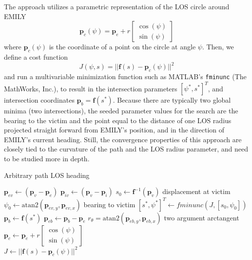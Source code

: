 \documentclass[conference]{IEEEtran}
\newcommand{\reference}{r_\theta}
\begin{document}
The approach utilizes a parametric representation of the LOS circle around EMILY
\begin{equation}
  \bm{p}_c(\psi) = \bm{p}_{e} + r \begin{bmatrix}
    \cos(\psi) \\ \sin(\psi)
  \end{bmatrix}
\end{equation}
where $\bm{p}_c(\psi)$ is the coordinate of a point on the circle at angle $\psi$. Then, we define a cost function
\begin{equation}
  J(\psi, s) = || \bm{f}(s) - \bm{p}_c(\psi) ||^2
\end{equation}
and run a multivariable minimization function such as MATLAB's \texttt{fminunc} (The MathWorks, Inc.), to result in the intersection parameters $[\psi^*, s^*]^T$, and intersection coordinates $\bm{p}_b = \bm{f}(s^*)$. Because there are typically two global minima (two intersections), the seeded parameter values for the search are the bearing to the victim and the point equal to the distance of one LOS radius projected straight forward from EMILY's position, and in the direction of EMILY's current heading. Still, the convergence properties of this approach are closely tied to the curvature of the path and the LOS radius parameter, and need to be studied more in depth.

\begin{algorithm}[h]
\caption{Arbitrary path LOS heading}\label{alg:arbitrary_los}
\begin{algorithmic}[1]
\State $\bm{p}_{ev} \gets (\bm{p}_{v} - \bm{p}_{e})$
\State $\bm{p}_{iv} \gets (\bm{p}_{v} - \bm{p}_{i})$
\State $s_0 \gets \bm{f}^{-1}(\bm{p}_{v})$ \Comment displacement at victim
\State $\psi_0 \gets \text{atan2}(\bm{p}_{ev,y}, \bm{p}_{ev,x})$ \Comment bearing to victim
\State $[s^*, \psi^*]^T \gets fminunc(J, [s_0, \psi_0])$
\State $\bm{p}_{b} \gets \bm{f}(s^*)$
\State $\bm{p}_{eb} \gets \bm{p}_{b} - \bm{p}_{e}$
\State $\reference = \text{atan2}(\bm{p}_{eb,y}, \bm{p}_{eb,x})$ \Comment two argument arctangent
\State \Return{$\reference$}
\EndFunction \\
\State $\bm{p}_c \gets \bm{p}_{e} + r \begin{bmatrix} \cos(\psi) \\ \sin(\psi) \end{bmatrix}$
\State {}
\EndFunction \\
\State $J \gets ||\bm{f}(s) - \bm{p}_c(\psi)||^2$
\State {}
\EndFunction
\end{algorithmic}
\end{algorithm}
\end{document}
